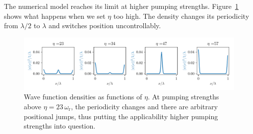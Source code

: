 \noindent The numerical model reaches its limit at higher pumping strengths. Figure~\ref{model_limit} shows what happens when we set $\eta$ too high. The density changes its periodicity from $\lambda / 2$ to $\lambda$ and switches position uncontrollably.

\begin{figure}[!htb]
	\centering
	\includegraphics[width=1\textwidth]{images/model_limit_trans.pdf}
	\caption{Wave function densities as functions of $\eta$. At pumping strengths above $\eta = 23 \, \omega_\text{r}$, the periodicity changes and there are arbitrary positional jumps, thus putting the applicability higher pumping strengths into question.}
	\label{model_limit}
\end{figure}
\FloatBarrier
